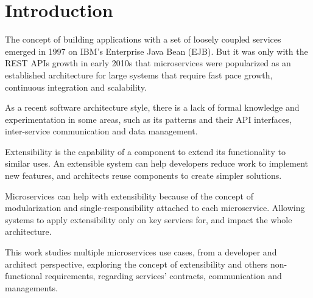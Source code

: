 \chapter{Introduction}
\label{cap:introduction}

\enlargethispage{.5\baselineskip}

The concept of building applications with a set of loosely coupled services emerged in 1997 on IBM's Enterprise Java Bean (EJB). But it was only with the REST APIs growth in early 2010s that microservices were popularized as an established architecture for large systems that require fast pace growth, continuous integration and scalability.

As a recent software architecture style, there is a lack of formal knowledge and experimentation in some areas, such as its patterns and their API interfaces, inter-service communication and data management.

Extensibility is the capability of a component to extend its functionality to similar uses. An extensible system can help developers reduce work to implement new features, and architects reuse components to create simpler solutions.

Microservices can help with extensibility because of the concept of modularization and single-responsibility attached to each microservice. Allowing systems to apply extensibility only on key services for, and impact the whole architecture.

This work studies multiple microservices use cases, from a developer and architect perspective, exploring the concept of extensibility and others non-functional requirements, regarding services’ contracts, communication and managements.